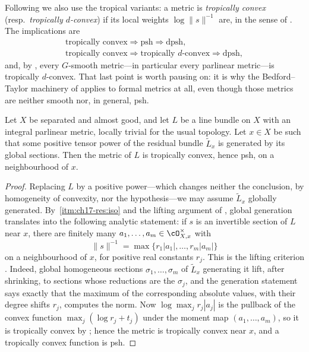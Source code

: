 Following  we also use the tropical variants:
a metric is \emph{tropically convex} (resp.\ \emph{tropically
$d$-convex}) if its local weights $\log\|s\|^{-1}$ are, in the sense of
.  The implications are
\[
 \begin{gathered}
 \text{tropically convex}\Rightarrow\text{psh}\Rightarrow\text{dpsh},\\
 \text{tropically convex}\Rightarrow\text{tropically }d\text{-convex}
 \Rightarrow\text{dpsh},
 \end{gathered}
\]
and, by , every $G$-smooth metric---in
particular every parlinear metric---is tropically $d$-convex.  That last
point is worth pausing on: it is why the Bedford--Taylor machinery of
 applies to formal metrics at all, even
though those metrics are neither smooth nor, in general, psh.

\begin{proposition}
\label{prop:ch17-globally-generated-psh}
Let $X$ be separated and almost good, and let $L$ be a line bundle on
$X$ with an integral parlinear metric, locally trivial for the usual
topology.  Let $x\in X$ be such that some positive tensor power of the
residual bundle $\widetilde L_x$ is generated by its global sections.
Then the metric of $L$ is tropically convex, hence psh, on a
neighbourhood of $x$.
\end{proposition}

\begin{proof}
Replacing $L$ by a positive power---which changes neither the conclusion,
by homogeneity of convexity, nor the hypothesis---we may assume
$\widetilde L_x$ globally generated.  By
\,\cref{itm:ch17-res:iso} and the lifting
argument of , global generation
translates into the following analytic statement: if $s$ is an invertible
section of $L$ near $x$, there are finitely many
$a_1,\dots,a_m\in\cO_{X,x}^\times$ with
\[
 \|s\|^{-1}=\max\{r_1|a_1|,\dots,r_m|a_m|\}
\]
on a neighbourhood of $x$, for positive real constants $r_j$.
This is the lifting criterion \cite[Corollary~17.4.12]{CLD25}.
Indeed, global homogeneous sections
$\sigma_1,\dots,\sigma_m$ of $\widetilde L_x$ generating it lift, after
shrinking, to sections whose reductions are the $\sigma_j$, and the
generation statement says exactly that the maximum of the corresponding
absolute values, with their degree shifts $r_j$, computes the norm.  Now
$\log\max_j r_j|a_j|$ is the pullback of the convex function
$\max_j(\log r_j+t_j)$ under the moment map $(a_1,\dots,a_m)$, so it is tropically
convex by ; hence the metric is
tropically convex near $x$, and a tropically convex function is psh.
\end{proof}

